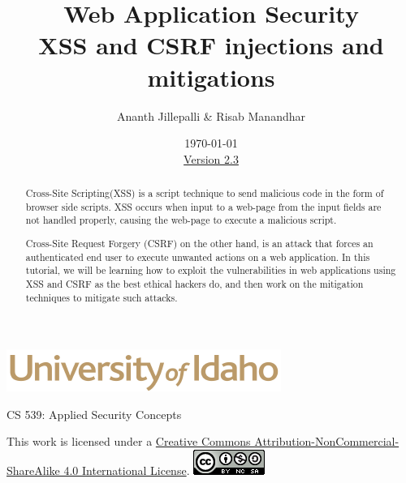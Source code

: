 \documentclass[12pt]{extarticle}
\begin{document}
\title{ Web Application Security\\XSS and CSRF injections and mitigations}
\author{Ananth Jillepalli \& Risab Manandhar}
\date{\today \\ \hyperref[changelog]{Version 2.3}}
\renewcommand{\abstractname}{Summary}
\begin{titlepage}
\maketitle
{}
\begin{center}
\includegraphics[scale=.5]{UofI}

\large{CS 539: Applied Security Concepts}

\vskip 40pt

\end{center}
\begin{abstract}
Cross-Site Scripting(XSS) is a script technique to send malicious code in the form of browser side scripts. XSS occurs when input to a web-page from the input fields are not handled properly, causing the web-page to execute a malicious script.

\vspace{4mm}
\noindent
Cross-Site Request Forgery (CSRF) on the other hand, is an attack that forces an authenticated end user to execute unwanted actions on a web application. In this tutorial, we will be learning how to exploit the vulnerabilities in web applications using XSS and CSRF as the best ethical hackers do, and then work on the mitigation techniques to mitigate such attacks.
\end{abstract}


\vfill
\begin{center}
This work is licensed under a \href{https://creativecommons.org/licenses/by-nc-sa/4.0/legalcode}{Creative Commons Attribution-NonCommercial-ShareAlike 4.0 International License}.
\vskip 10pt
\includegraphics[scale=.5]{cc}
\end{center}

\end{titlepage}

\end{document}
